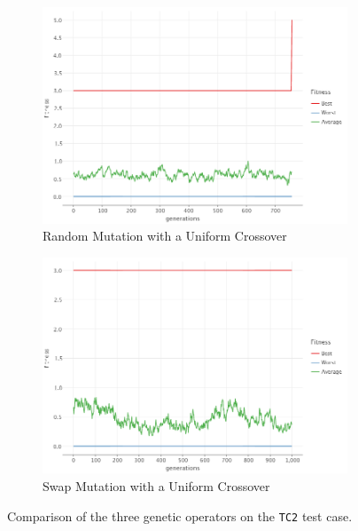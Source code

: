 \begin{figure}[ht!]
\begin{subfigure}{0.45\textwidth}
            \includegraphics[width=\textwidth]{img/beacon_uniform_random_2.png}
            \caption{Random Mutation with a Uniform Crossover}
            \label{fig:beacon:4:random}
        \end{subfigure}
        \hfill
        \begin{subfigure}{0.45\textwidth}
            \includegraphics[width=\textwidth]{img/beacon_uniform_swap_2.png}
            \caption{Swap Mutation with a Uniform Crossover}
            \label{fig:beacon:4:swap}
        \end{subfigure}
        \caption{Comparison of the three genetic operators on the \texttt{TC2} test case.}
        \label{fig:beacon:2}
    \end{figure}

